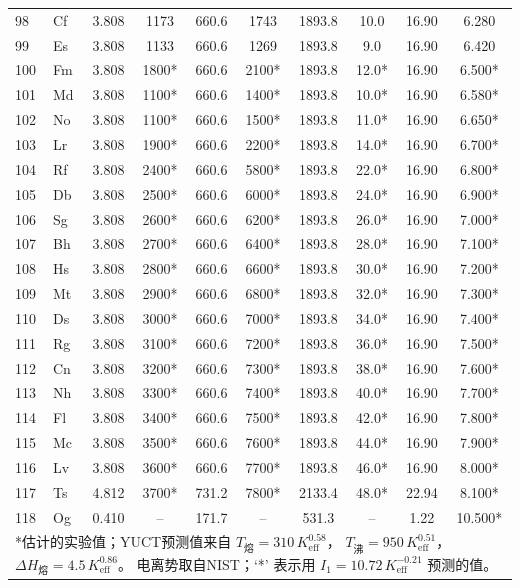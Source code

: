 \documentclass[11pt,a4paper]{article}
\begin{document}
\begin{longtable}{@{}llcccccccc@{}}
		98 & Cf  & 3.808 & 1173   & 660.6  & 1743   & 1893.8 & 10.0  & 16.90 & 6.280 \\
		99 & Es  & 3.808 & 1133   & 660.6  & 1269   & 1893.8 & 9.0   & 16.90 & 6.420 \\
		100& Fm  & 3.808 & 1800*  & 660.6  & 2100*  & 1893.8 & 12.0* & 16.90 & 6.500* \\
		101& Md  & 3.808 & 1100*  & 660.6  & 1400*  & 1893.8 & 10.0* & 16.90 & 6.580* \\
		102& No  & 3.808 & 1100*  & 660.6  & 1500*  & 1893.8 & 11.0* & 16.90 & 6.650* \\
		103& Lr  & 3.808 & 1900*  & 660.6  & 2200*  & 1893.8 & 14.0* & 16.90 & 6.700* \\
		104& Rf  & 3.808 & 2400*  & 660.6  & 5800*  & 1893.8 & 22.0* & 16.90 & 6.800* \\
		105& Db  & 3.808 & 2500*  & 660.6  & 6000*  & 1893.8 & 24.0* & 16.90 & 6.900* \\
		106& Sg  & 3.808 & 2600*  & 660.6  & 6200*  & 1893.8 & 26.0* & 16.90 & 7.000* \\
		107& Bh  & 3.808 & 2700*  & 660.6  & 6400*  & 1893.8 & 28.0* & 16.90 & 7.100* \\
		108& Hs  & 3.808 & 2800*  & 660.6  & 6600*  & 1893.8 & 30.0* & 16.90 & 7.200* \\
		109& Mt  & 3.808 & 2900*  & 660.6  & 6800*  & 1893.8 & 32.0* & 16.90 & 7.300* \\
		110& Ds  & 3.808 & 3000*  & 660.6  & 7000*  & 1893.8 & 34.0* & 16.90 & 7.400* \\
		111& Rg  & 3.808 & 3100*  & 660.6  & 7200*  & 1893.8 & 36.0* & 16.90 & 7.500* \\
		112& Cn  & 3.808 & 3200*  & 660.6  & 7300*  & 1893.8 & 38.0* & 16.90 & 7.600* \\
		113& Nh  & 3.808 & 3300*  & 660.6  & 7400*  & 1893.8 & 40.0* & 16.90 & 7.700* \\
		114& Fl  & 3.808 & 3400*  & 660.6  & 7500*  & 1893.8 & 42.0* & 16.90 & 7.800* \\
		115& Mc  & 3.808 & 3500*  & 660.6  & 7600*  & 1893.8 & 44.0* & 16.90 & 7.900* \\
		116& Lv  & 3.808 & 3600*  & 660.6  & 7700*  & 1893.8 & 46.0* & 16.90 & 8.000* \\
		117& Ts  & 4.812 & 3700*  & 731.2  & 7800*  & 2133.4 & 48.0* & 22.94 & 8.100* \\
		118& Og  & 0.410 & --     & 171.7  & --     & 531.3  & --    & 1.22  & 10.500* \\
		\bottomrule
		\multicolumn{10}{p{0.9\textwidth}}{\footnotesize
			*估计的实验值；YUCT预测值来自 \(T_{\text{熔}}=310\,K_{\mathrm{eff}}^{0.58}\)， 
			\(T_{\text{沸}}=950\,K_{\mathrm{eff}}^{0.51}\)， 
			\(\Delta H_{\text{熔}}=4.5\,K_{\mathrm{eff}}^{0.86}\)。  
			电离势取自NIST；`*' 表示用 \(I_1 = 10.72\,K_{\mathrm{eff}}^{-0.21}\) 预测的值。}
	\end{longtable}
	
\end{document}
